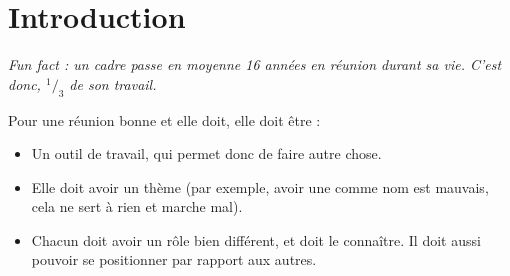 \section{Introduction}
\emph{Fun fact : un cadre passe en moyenne 16 années en réunion durant sa vie. C'est donc, $ ^1/_3 $ de son travail.\\}

Pour une réunion bonne et elle doit, elle doit être :
\begin{itemize}
    \item Un outil de travail, qui permet donc de faire autre chose.
    \item Elle doit avoir un thème (par exemple, avoir une comme nom  est mauvais, cela ne sert à rien et marche mal).
    \item Chacun doit avoir un rôle bien différent, et doit le connaître. Il doit aussi pouvoir se positionner par rapport aux autres.
\end{itemize}
